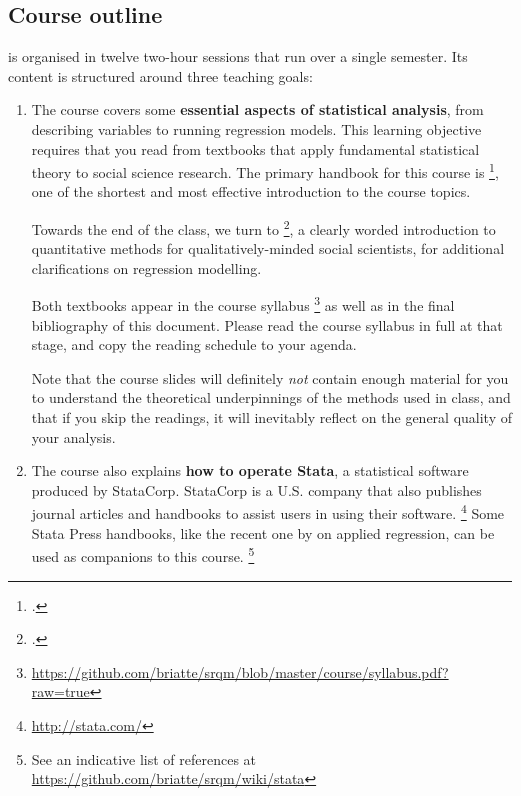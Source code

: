 \subsection{Course outline}%

 is organised in twelve two-hour sessions that run over a single semester. Its content is structured around three teaching goals:%

\begin{enumerate}
  

	\label{sec:textbooks}%
  \item The course covers some \textbf{essential aspects of statistical analysis}, from describing variables to running regression models. %
  	This learning objective requires that you read from textbooks that apply fundamental statistical theory to social science research. The primary handbook for this course is \footcite{Urdan:2010a}, one of the shortest and most effective introduction to the course topics. %
	
		Towards the end of the class, we turn to \footcite{FeinsteinThomas:2002d}, a clearly worded introduction to quantitative methods for qualitatively-minded social scientists, for additional clarifications on regression modelling.%
  
  	Both textbooks appear in the course syllabus%
		\footnote{\url{https://github.com/briatte/srqm/blob/master/course/syllabus.pdf?raw=true}} as well as in the final bibliography of this document. Please read the course syllabus in full at that stage, and copy the reading schedule to your agenda.%
		
		Note that the course slides will definitely \emph{not} contain enough material for you to understand the theoretical underpinnings of the methods used in class, and that if you skip the readings, it will inevitably reflect on the general quality of your analysis.%


  \item The course also explains \textbf{how to operate Stata}, a statistical software produced by StataCorp. %
	  StataCorp is a U.S. company that also publishes journal articles and handbooks to assist users in using their software.%
		\footnote{\url{http://stata.com/}} %
		Some Stata Press handbooks, like the recent one by \citeauthor{Mitchell:2012a} on applied regression, can be used as companions to this course.%
		\footnote{See an indicative list of references at %
			\url{https://github.com/briatte/srqm/wiki/stata}} %
		

\end{enumerate}
